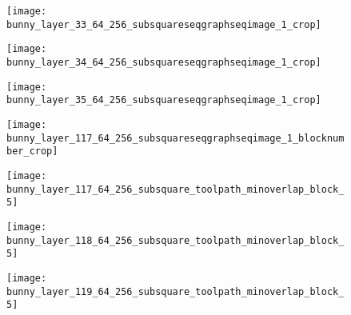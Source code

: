 \begin{figure*}[htp!] 
  \centering
  \begin{subfigure}[t]{2.1in}
    \centering
    \texttt{[image: bunny\_layer\_33\_64\_256\_subsquareseqgraphseqimage\_1\_crop]}
    \caption{\label{fig:maxorivariationandminvariationa}}
  \end{subfigure}
  \begin{subfigure}[t]{2.1in}
    \centering
    \texttt{[image: bunny\_layer\_34\_64\_256\_subsquareseqgraphseqimage\_1\_crop]}
    \caption{\label{fig:maxorivariationandminvariationb}}
  \end{subfigure}
  \begin{subfigure}[t]{2.1in}
    \centering
    \texttt{[image: bunny\_layer\_35\_64\_256\_subsquareseqgraphseqimage\_1\_crop]}
    \caption{\label{fig:maxorivariationandminvariationc}}
  \end{subfigure}
  \begin{subfigure}[t]{2.1in}
    \centering
    \texttt{[image: bunny\_layer\_117\_64\_256\_subsquareseqgraphseqimage\_1\_blocknumber\_crop]}
    \caption{\label{fig:maxorivariationandminvariationd}}
  \end{subfigure}
  \hspace{1in}
  \begin{subfigure}[t]{1.5in}
    \centering
    \texttt{[image: bunny\_layer\_117\_64\_256\_subsquare\_toolpath\_minoverlap\_block\_5]}
    \caption{\label{fig:maxorivariationandminvariatione}}
  \end{subfigure}
  \begin{subfigure}[t]{1.5in}
    \centering
    \texttt{[image: bunny\_layer\_118\_64\_256\_subsquare\_toolpath\_minoverlap\_block\_5]}
    \caption{\label{fig:maxorivariationandminvariationf}}
  \end{subfigure}
  \begin{subfigure}[t]{1.5in}
    \centering
    \texttt{[image: bunny\_layer\_119\_64\_256\_subsquare\_toolpath\_minoverlap\_block\_5]}
    \caption{\label{fig:maxorivariationandminvariationg}}
  \end{subfigure}
  \caption{\label{fig:maxorivariationandminvariation}
    Figures \ref{fig:maxorivariationandminvariationa}, \ref{fig:maxorivariationandminvariationb}, \ref{fig:maxorivariationandminvariationc} show decompositions for layers $33, 34, 35$ of the Bunny.
    Figure \ref{fig:maxorivariationandminvariationd} shows dual graph of layer $117$ with Block $5$ (present in layers $117, 118, 119$).
    Figures \ref{fig:maxorivariationandminvariatione}, \ref{fig:maxorivariationandminvariationf}, \ref{fig:maxorivariationandminvariationg} show tool path in those layers with minimum overlap on Block $5$.
  }
\end{figure*}


